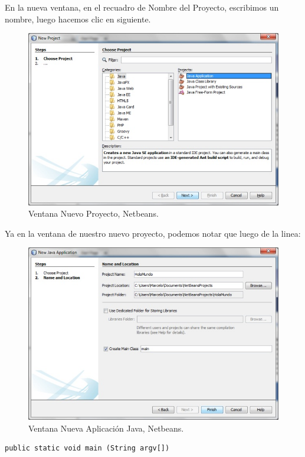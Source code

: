 \documentclass[12pt]{book} %
\begin{document}
En la nueva ventana, en el recuadro de Nombre del Proyecto, escribimos un nombre, luego hacemos clic en siguiente.

	\begin{figure}[h]
		\centering
			\includegraphics[width=12cm]{Hola_mundo_002.jpg}
			\caption{Ventana Nuevo Proyecto, Netbeans.}
		
	\end{figure}

Ya en la ventana de nuestro nuevo proyecto, podemos notar que luego de la linea:

	\begin{figure}[h]
		\centering
			\includegraphics[width=12cm]{Hola_mundo_003.jpg}
			\caption{Ventana Nueva Aplicación Java, Netbeans.}
		
	\end{figure}


\noindent
\begin{lstlisting}[frame=single]
   public static void main (String argv[])
\end{lstlisting}
\end{document}
